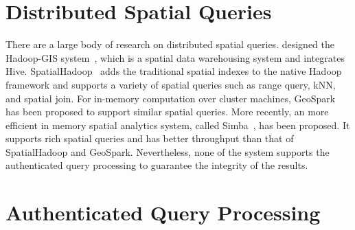 \section{Distributed Spatial Queries}

There are a large body of research on distributed spatial queries. \citeauthor{10.14778/2536222.2536227} designed the Hadoop-GIS system~\cite{10.14778/2536222.2536227}, which is a spatial data warehousing system and integrates Hive. SpatialHadoop~\cite{10.1109/icde.2015.7113382} adds the traditional spatial indexes to the native Hadoop framework and supports a variety of spatial queries such as range query, kNN, and spatial join. For in-memory computation over cluster machines, GeoSpark~\cite{10.1145/2820783.2820860} has been proposed to support similar spatial queries. More recently, an more efficient in memory spatial analytics system, called Simba~\cite{10.1145/2882903.2915237}, has been proposed. It supports rich spatial queries and has better throughput than that of SpatialHadoop and GeoSpark. Nevertheless, none of the system supports the authenticated query processing to guarantee the integrity of the results.

\section{Authenticated Query Processing}
